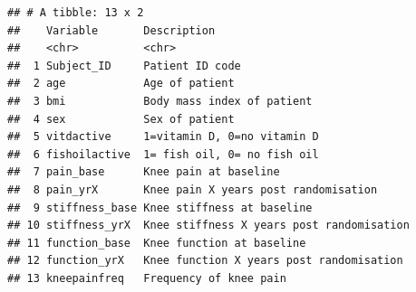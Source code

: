 \documentclass{article}
\begin{document}
\begin{verbatim}
## # A tibble: 13 x 2
##    Variable       Description                              
##    <chr>          <chr>                                    
##  1 Subject_ID     Patient ID code                          
##  2 age            Age of patient                           
##  3 bmi            Body mass index of patient               
##  4 sex            Sex of patient                           
##  5 vitdactive     1=vitamin D, 0=no vitamin D              
##  6 fishoilactive  1= fish oil, 0= no fish oil              
##  7 pain_base      Knee pain at baseline                    
##  8 pain_yrX       Knee pain X years post randomisation     
##  9 stiffness_base Knee stiffness at baseline               
## 10 stiffness_yrX  Knee stiffness X years post randomisation
## 11 function_base  Knee function at baseline                
## 12 function_yrX   Knee function X years post randomisation 
## 13 kneepainfreq   Frequency of knee pain
\end{verbatim}
\end{document}
